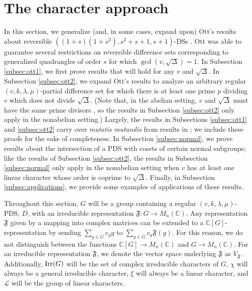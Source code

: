 \documentclass[12pt]{amsproc} %
\theoremstyle{definition}\newtheorem{defn}[thm]{Definition}
\theoremstyle{definition}\newtheorem{rem}[thm]{Remark}
\theoremstyle{definition}\newtheorem{ex}[thm]{Example}
\newcommand{\Irr}{{\rm Irr}}
\newcommand{\C}{\mathbb{C}}
\newcommand{\repF}{\mathfrak{F}}
\begin{document}
\section{The character approach}
\label{sect:ott}

In this section, we generalize (and, in some cases, expand upon) Ott's results about reversible $((1+s)(1+s^2), s^2 + s + 1, s+1)$-DSs \cite{ott}. Ott was able to guarantee several restrictions on reversible difference sets corresponding to generalized quadrangles of order $s$ for which $\gcd(v, \sqrt\Delta) = 1$. In Subsection \ref{subsec:ott1}, we first prove results that will hold for any $v$ and $\sqrt{\Delta}$.  In Subsection \ref{subsec:ott2}, we expand Ott's results to analyze an arbitrary regular $(v, k, \lambda, \mu)$-partial difference set for which there is at least one prime $p$ dividing $v$ which does not divide $\sqrt\Delta$. (Note that, in the abelian setting, $v$ and $\sqrt{\Delta}$ must have the same prime divisors \cite[Theorem 6.1]{ma}, so the results in Subsection \ref{subsec:ott2} only apply in the nonabelian setting.) Largely, the results in Subsections \ref{subsec:ott1} and \ref{subsec:ott2} carry over \textit{mutatis mutandis} from results in \cite{ott}; we include these proofs for the sake of completeness.  In Subsection \ref{subsec:normal}, we prove results about the intersection of a PDS with cosets of certain normal subgroups; like the results of Subsection \ref{subsec:ott2}, the results in Subsection \ref{subsec:normal} only apply in the nonabelian setting when $v$ has at least one linear character whose order is coprime to $\sqrt{\Delta}$.  Finally, in Subsection \ref{subsec:applications}, we provide some examples of applications of these results.


Throughout this section, $G$ will be a group containing a regular $(v,k,\lambda,\mu)$-PDS, $D$, with an irreducible representation $\repF: G \longrightarrow M_n(\C)$. Any representation $\repF$ given by a mapping into complex matrices can be extended to a $\C[G]$-representation by sending $\sum_{g\in G} c_gg$ to $\sum_{g\in G} c_g\repF(g)$. For this reason, we do not distinguish between the functions $\C[G]\longrightarrow M_n(\C)$ and $G\longrightarrow M_n(\C)$. For an irreducible representation $\repF$, we denote the vector space underlying $\repF$ as $V_\repF$. Additionally, $\Irr(G)$ will be the set of complex irreducible characters of $G$, $\chi$ will always be a general irreducible character, $\xi$ will always be a linear character, and $\mathcal{L}$ will be the group of linear characters.
\end{document}
